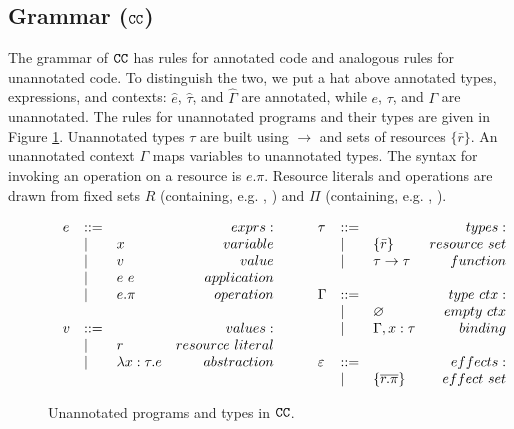 \subsection{Grammar ($\mathtt{CC}$)}

The grammar of $\mathtt{CC}$ has rules for annotated code and
analogous rules for unannotated code. To distinguish the two, we put a
hat above annotated types, expressions, and contexts: $\hat e$,
$\hat \tau$, and $\hat \Gamma$ are annotated, while $e$, $\tau$, and
$\Gamma$ are unannotated. The rules for unannotated programs and their
types are given in Figure
\ref{fig:epscalc_unannotated_grammar}. Unannotated types $\tau$ are
built using $\rightarrow$ and sets of resources $\{ \bar r \}$. An
unannotated context $\Gamma$ maps variables to unannotated types.
The syntax for invoking an operation on a resource is $e.\pi$. Resource
literals and operations are drawn from fixed sets $R$ (containing, e.g.
, ) and $\Pi$ (containing, e.g. ,
).

\begin{figure}[htb]
\vspace*{-5mm}
\[
\begin{array}{lll}
\begin{array}{lllr}
e & ::= & ~ & exprs: \\
	& | & x & variable \\
	& | & v & value \\
	& | & e ~ e & application \\
	& | & e.\pi & operation \\
	&&\\

v & ::= & ~ & values: \\
	& | & r & resource~literal \\
	& | & \lambda x: \tau.e & abstraction \\
&&\\
\end{array}
\hspace{5ex}
\begin{array}{lllr}
\tau & ::= & ~ & types: \\
		& | & \{ \bar r \} & resource~set \\
		& | & \tau \rightarrow \tau & function\\ 
		&&\\

\Gamma & ::= & ~ & type~ctx: \\
				& | & \varnothing & empty~ctx\\
				& | & \Gamma, x: \tau & binding\\
				&&\\
				
\varepsilon & ::= & ~ & effects: \\
		& | & \{ \overline{r.\pi} \} & effect~set
\end{array}
\end{array}
\]
\vspace*{-5mm}
\caption{Unannotated programs and types in $\mathtt{CC}$.}
\vspace*{-5mm}
\label{fig:epscalc_unannotated_grammar}
\end{figure}

